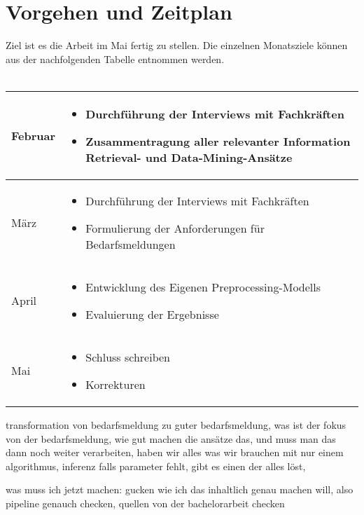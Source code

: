 \documentclass[a4paper,12pt]{scrreprt}
\newcommand{\hiddenchapter}[1]{
	\chapter*{{#1}}
}
\begin{document}
\hiddenchapter{Vorgehen und Zeitplan}
Ziel ist es die Arbeit im Mai fertig zu stellen. Die einzelnen Monatsziele können aus der nachfolgenden Tabelle entnommen werden. \\ \\
\begin{tabularx}{1\textwidth} { 
		| >{\raggedright\arraybackslash}X 
		| >{\raggedright\arraybackslash}X | }
	\hline
	Februar
	& \begin{itemize}
		\item Durchführung der Interviews mit Fachkräften
		\item Zusammentragung aller relevanter Information Retrieval- und Data-Mining-Ansätze 
	\end{itemize}\\
	\hline
	März
	& \begin{itemize}
		\item Durchführung der Interviews mit Fachkräften
		\item Formulierung der Anforderungen für Bedarfsmeldungen
	\end{itemize}\\
	\hline
	April
	& \begin{itemize}
		\item Entwicklung des Eigenen Preprocessing-Modells
		\item Evaluierung der Ergebnisse
	\end{itemize}\\
	\hline
	Mai
	& \begin{itemize}
		\item Schluss schreiben
		\item Korrekturen
	\end{itemize}\\
	\hline
\end{tabularx}
\newpage

\renewcommand\contentsname{Aufbau der Arbeit}
\tableofcontents


transformation von bedarfsmeldung zu guter bedarfsmeldung, was ist der fokus von der bedarfsmeldung, wie gut machen die ansätze das, und muss man das dann noch weiter verarbeiten, haben wir alles was wir brauchen mit nur einem algorithmus, inferenz falls parameter fehlt, gibt es einen der alles löst,

was muss ich jetzt machen: gucken wie ich das inhaltlich genau machen will, also pipeline genauch checken, quellen von der bachelorarbeit checken











%







%
%
\raggedright
\printbibliography
\end{document}
